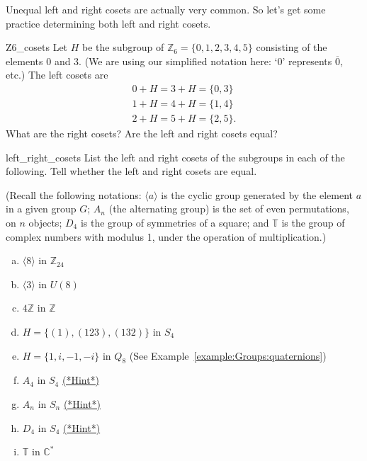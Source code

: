 Unequal left and right cosets are actually very common.  So let's get some practice determining both left and right cosets.

\begin{exercise}{Z6_cosets}
Let $H$ be the subgroup of ${\mathbb Z}_6 = \{0,1,2,3,4,5\}$ consisting of the elements 0 and 3.
(We are using our simplified notation here: `0' represents $\overline{0}$, etc.)  The left cosets are 
\begin{gather*}
0 + H = 3 + H = \{ 0, 3 \} \\
1 + H = 4 + H = \{ 1, 4 \} \\
2 + H = 5 + H = \{ 2, 5 \}.
\end{gather*}
What are the right cosets? Are the left and right cosets equal?
\end{exercise}

\begin{exercise}{left_right_cosets}
List the left and right cosets of the subgroups in each of the following.  Tell whether the left and right cosets are equal.

\noindent
(Recall the following notations: $\langle a \rangle$ is the cyclic group generated by the element $a$ in a given group $G$; $A_n$ (the alternating group) is the set of even permutations, on $n$ objects; $D_4$ is the group of symmetries of a square; and ${\mathbb T}$ is the group of complex numbers with modulus 1, under the operation of multiplication.)

\begin{multicols}{2}
\begin{enumerate}[(a)]

\item 
$\langle 8 \rangle$ in ${\mathbb Z}_{24}$

\item
$\langle 3 \rangle$ in $U(8)$

\item
$4{\mathbb Z}$ in ${\mathbb Z}$

\item
$H = \{ (1), (123), (132) \}$ in $S_4$

\item
$H = \{1,i,-1,-i\}$ in $Q_8$ (See Example~\ref{example:Groups:quaternions})

\item
$A_4$ in $S_4$ \hyperref[sec:Cosets:Hints]{(*Hint*)}

\item
$A_n$ in $S_n$ \hyperref[sec:Cosets:Hints]{(*Hint*)}

\item
$D_4$ in $S_4$ \hyperref[sec:Cosets:Hints]{(*Hint*)}

\item
${\mathbb T}$ in ${\mathbb C}^\ast$ 



\end{enumerate}
\end{multicols}
\end{exercise} 

